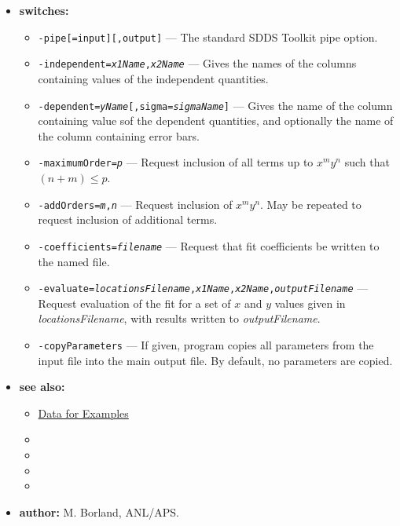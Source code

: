 \begin{itemize}
\item {\bf switches:}
    \begin{itemize}
    \item {\tt -pipe[=input][,output]} --- The standard SDDS Toolkit pipe option.
    \item {\tt -independent={\em x1Name},{\em x2Name}} --- Gives the names of the columns containing values of
      the independent quantities.
    \item {\tt -dependent={\em yName}[,sigma={\em sigmaName}]} --- Gives the name of the column containing value sof
      the dependent quantities, and optionally the name of the column containing error bars.
    \item {\tt -maximumOrder={\em p}} --- Request inclusion of all terms up to $x^m y^n$ such that $(n+m)\leq p$.
    \item {\tt -addOrders={\em m},{\em n}} --- Request inclusion of $x^m y^n$. May be repeated to request inclusion of
      additional terms.
    \item {\tt -coefficients={\em filename}} --- Request that fit coefficients be written to the named file.
    \item {\tt -evaluate={\em locationsFilename},{\em x1Name},{\em x2Name},{\em outputFilename}} --- Request evaluation
      of the fit for a set of $x$ and $y$ values given in {\em locationsFilename}, with results written to 
      {\em outputFilename}.
    \item {\tt -copyParameters} --- If given, program copies all parameters from the input file
      into the main output file.  By default, no parameters are copied.
    \end{itemize}
\item {\bf see also:}
    \begin{itemize}
    \item \hyperref[exampleData]{Data for Examples}
    \item {}
    \item {}
    \item {}
    \item {}
    \end{itemize}
\item {\bf author:} M. Borland, ANL/APS.


\end{itemize}
